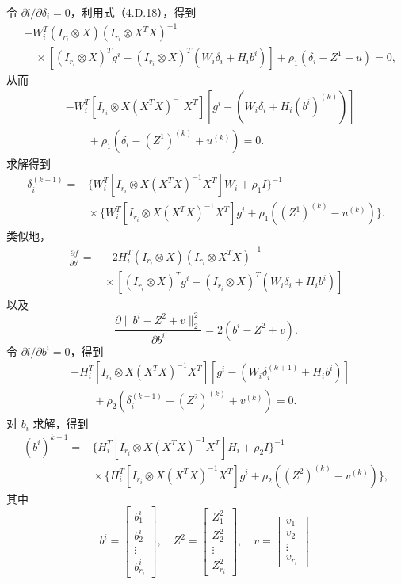 令 $\partial l/\partial\delta_i=0$，利用式（4.D.18），得到
\[
\begin{aligned}
&-W_i^T(I_{r_i}\otimes X)(I_{r_i}\otimes X^TX)^{-1}\\
&\quad{}\times[(I_{r_i}\otimes X)^Tg^i-(I_{r_i}\otimes X)^T(W_i\delta_i+H_ib^i)]
+\rho_1(\delta_i-Z^1+u)=0,
\end{aligned}
\]
从而
\begin{equation}
\begin{aligned}
&-W_i^T[I_{r_i}\otimes X(X^TX)^{-1}X^T]
 [g^i-(W_i\delta_i+H_i(b^i)^{(k)})]\\
&\qquad{}+\rho_1(\delta_i-(Z^1)^{(k)}+u^{(k)})=0.
\end{aligned}\tag{4.D.19}
\end{equation}
求解得到
\begin{equation}
\begin{aligned}
\delta_i^{(k+1)}={}&
\{W_i^T[I_{r_i}\otimes X(X^TX)^{-1}X^T]W_i+\rho_1I\}^{-1}\\
&{}\times\{W_i^T[I_{r_i}\otimes X(X^TX)^{-1}X^T]g^i
+\rho_1((Z^1)^{(k)}-u^{(k)})\}.
\end{aligned}\tag{4.D.20}
\end{equation}
类似地，
\[
\begin{aligned}
\frac{\partial f}{\partial b^i}
={}&-2H_i^T(I_{r_i}\otimes X)(I_{r_i}\otimes X^TX)^{-1}\\
&{}\times[(I_{r_i}\otimes X)^Tg^i-(I_{r_i}\otimes X)^T(W_i\delta_i+H_ib^i)]
\end{aligned}
\]
以及
\[
\frac{\partial\|b^i-Z^2+v\|_2^2}{\partial b^i}=2(b^i-Z^2+v).
\]
令 $\partial l/\partial b^i=0$，得到
\begin{equation}
\begin{aligned}
&-H_i^T[I_{r_i}\otimes X(X^TX)^{-1}X^T]
 [g^i-(W_i\delta_i^{(k+1)}+H_ib^i)]\\
&\qquad{}+\rho_2(\delta_i^{(k+1)}-(Z^2)^{(k)}+v^{(k)})=0.
\end{aligned}\tag{4.D.21}
\end{equation}
对 $b_i$ 求解，得到
\begin{equation}
\begin{aligned}
(b^i)^{k+1}={}&
\{H_i^T[I_{r_i}\otimes X(X^TX)^{-1}X^T]H_i+\rho_2I\}^{-1}\\
&{}\times\{H_i^T[I_{r_i}\otimes X(X^TX)^{-1}X^T]g^i
+\rho_2((Z^2)^{(k)}-v^{(k)})\},
\end{aligned}\tag{4.D.22}
\end{equation}
其中
\[
b^i=\begin{bmatrix}b_1^i\\b_2^i\\\vdots\\b_{r_i}^i\end{bmatrix},\quad
Z^2=\begin{bmatrix}Z_1^2\\Z_2^2\\\vdots\\Z_{r_i}^2\end{bmatrix},\quad
v=\begin{bmatrix}v_1\\v_2\\\vdots\\v_{r_i}\end{bmatrix}.
\]
